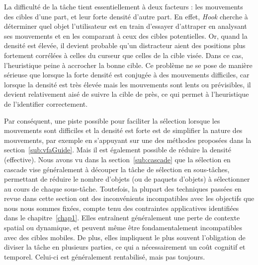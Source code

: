 	La difficulté de la tâche tient essentiellement à deux facteurs : les mouvements des cibles d'une part, et leur forte densité d'autre part. En effet, \emph{Hook} cherche à déterminer quel objet l'utilisateur est en train d'essayer d'attraper en analysant ses mouvements et en les comparant à ceux des cibles potentielles. Or, quand la densité est élevée, il devient probable qu'un distracteur aient des positions plus fortement corrélées à celles du curseur que celles de la cible visée. Dans ce cas, l'heuristique peine à accrocher la bonne cible. Ce problème ne se pose de manière sérieuse que lorsque la forte densité est conjugée à des mouvements difficiles, car lorsque la densité est très élevée mais les mouvements sont lents ou prévisibles, il devient relativement aisé de suivre la cible de près, ce qui permet à l'heuristique de l'identifier correctement.
	
	Par conséquent, une piste possible pour faciliter la sélection lorsque les mouvements sont difficiles et la densité est forte est de simplifier la nature des mouvements, par exemple en s'appuyant sur une des méthodes proposées dans la section~\ref{sub:vfaGuide}. Mais il est également possible de réduire la densité (effective). Nous avons vu dans la section~\ref{sub:cascade} que la sélection en cascade vise généralement à découper la tâche de sélection en sous-tâches, permettant de réduire le nombre d'objets (ou de paquets d'objets) à sélectionner au cours de chaque sous-tâche. Toutefois, la plupart des techniques passées en revue dans cette section ont des inconvénients incompatibles avec les objectifs que nous nous sommes fixées, compte tenu des contraintes applicatives identifiées dans le chapitre~\ref{chap1}. Elles entraînent généralement une perte de contexte spatial ou dynamique, et peuvent même être fondamentalement incompatibles avec des cibles mobiles. De plus, elles impliquent le plus souvent l'obligation de diviser la tâche en plusieurs parties, ce qui a nécessairement un coût cognitif et temporel. Celui-ci est généralement rentabilisé, mais pas toujours.
	
